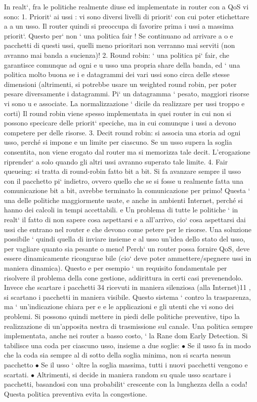 \documentclass[a4paper,12pt]{article}
\begin{document}
In realt`, fra le politiche realmente diuse ed implementate in router con
a
QoS vi sono:
1. Priorit` ai ussi : vi sono diversi livelli di priorit` con cui poter etichettare
a
a
un usso. Il router quindi si preoccupa di favorire prima i ussi a massima
priorit`. Questo per` non ` una politica fair ! Se continuano ad arrivare
a
o
e
pacchetti di questi ussi, quelli meno prioritari non verranno mai serviti
(non avranno mai banda a sucienza)!
2. Round robin: ` una politica pi` fair, che garantisce comunque ad ogni
e
u
usso una propria share della banda, ed ` una politica molto buona se i
e
datagrammi dei vari ussi sono circa delle stesse dimensioni (altrimenti,
si potrebbe usare un weighted round robin, per poter pesare diversamente
i datagrammi. Pi` un datagramma ` pesato, maggiori risorse vi sono
u
e
associate. La normalizzazione ` dicile da realizzare per ussi troppo
e
corti) Il round robin viene spesso implementata in quei router in cui non
si possono specicare delle priorit` speciche, ma in cui comunque i ussi
a
devono competere per delle risorse.
3. Decit round robin: si associa una storia ad ogni usso, perché si impone
e
un limite per ciascuno. Se un usso supera la soglia consentita, non viene
erogato dal router ma si memorizza tale decit. L'erogazione riprender`
a
solo quando gli altri ussi avranno superato tale limite.
4. Fair queueing: si tratta di round-robin fatto bit a bit. Si fa avanzare
sempre il usso con il pacchetto pi` indietro, ovvero quello che se si fosse
u
realmente fatta una comunicazione bit a bit, avrebbe terminato la comunicazione per primo! Questa ` una delle politiche
maggiormente usate,
e
anche in ambienti Internet, perché si hanno dei calcoli in tempi accettabili.
e
Un problema di tutte le politiche ` in realt` il fatto di non sapere cosa aspettarsi
e
a
all'arrivo, cio` cosa aspettarsi dai ussi che entrano nel router e che devono come
petere per le risorse. Una soluzione possibile ` quindi quella di inviare insieme
e
al usso un'idea dello stato del usso, per vagliare quanto sia pesante o meno!
Perch` un router possa fornire QoS, deve essere dinamicamente ricongurae
bile (cio` deve poter ammettere/spegnere ussi in maniera dinamica). Questo
e
per esempio ` un requisito fondamentale per risolvere il problema della cone
gestione, addirittura in certi casi prevenendolo. Invece che scartare i pacchetti
34
ricevuti in maniera silenziosa (alla Internet)11 , si scartano i pacchetti in maniera
visibile. Questo sistema ` contro la trasparenza, ma ` un'indicazione chiara per
e
e
le applicazioni e gli utenti che vi sono dei problemi. Si possono quindi mettere
in piedi delle politiche preventive, tipo la realizzazione di un'apposita nestra di
trasmissione sul canale.
Una politica sempre implementata, anche nei router a basso costo, ` la Rane
dom Early Detection. Si tabilisce una coda per ciascuno usso, insieme a due
soglie:
$\bullet$ Se il usso fa in modo che la coda sia sempre al di sotto della soglia
minima, non si scarta nessun pacchetto
$\bullet$ Se il usso ` oltre la soglia massima, tutti i nuovi pacchetti vengono
e
scartati.
$\bullet$ Altrimenti, si decide in maniera random su quale usso scartare i pacchetti, basandosi con una probabilit`
crescente con la lunghezza della
a
coda!
Questa politica preventiva evita la congestione.
\end{document}
